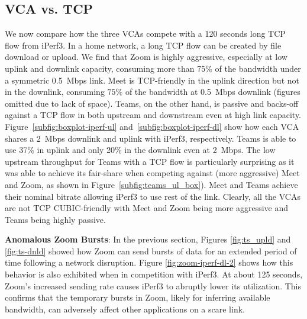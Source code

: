 \subsection{VCA vs. TCP}

We now compare how the three VCAs compete with a 120 seconds long TCP flow
from iPerf3. In a home network, a long TCP flow can be created by file
download or upload. We find that Zoom is highly aggressive,  especially at low
uplink and downlink capacity, consuming more than 75\% of the bandwidth under
a symmetric 0.5~Mbps link. Meet is TCP-friendly in the uplink direction but
not in the downlink, consuming $75\%$ of the bandwidth at 0.5~Mbps downlink
(figures omitted due to lack of space). Teams, on the other hand, is passive
and backs-off against a TCP flow in both upstream and downstream even at high
link capacity. Figure~\ref{subfig:boxplot-iperf-ul}
and~\ref{subfig:boxplot-iperf-dl} show how each VCA shares a 2~Mbps downlink
and uplink with iPerf3, respectively. Teams is able to use 37\% in uplink and
only 20\% in the downlink even at 2~Mbps. The low upstream throughput for
Teams with a TCP flow is particularly surprising as it was able to achieve its
fair-share when competing against (more aggressive) Meet and Zoom, as shown in Figure~\ref{subfig:teams_ul_box}). Meet and Teams achieve their nominal bitrate allowing iPerf3 to use rest of the link. Clearly, all the VCAs are not TCP CUBIC-friendly with Meet and Zoom being more aggressive and Teams being highly passive. 


\textbf{Anomalous Zoom Bursts}: In the previous section, Figures \ref{fig:ts_upld} and \ref{fig:ts-dnld} showed how Zoom can send bursts of data for an extended period of time following a network disruption. Figure \ref{fig:zoom-iperf-dl-2} shows how this behavior is also exhibited when in competition with iPerf3. At about 125 seconds, Zoom's increased sending rate causes iPerf3 to abruptly lower its utilization. This confirms that the temporary bursts in Zoom, likely for inferring available bandwidth, can adversely affect other applications on a scare link. 


